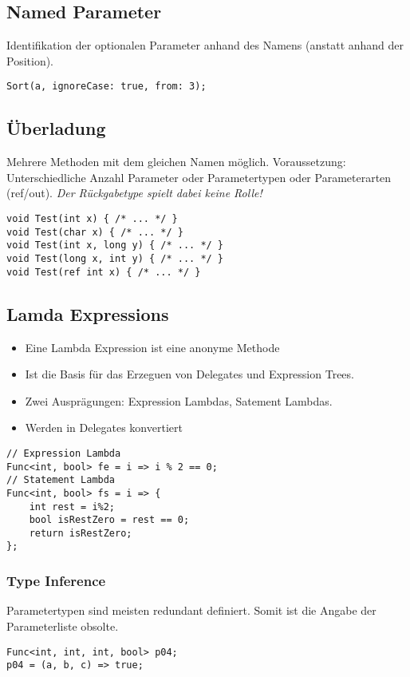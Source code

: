 \subsection{Named Parameter}
Identifikation der optionalen Parameter anhand des Namens (anstatt anhand der Position). 
\begin{lstlisting}
Sort(a, ignoreCase: true, from: 3);
\end{lstlisting}

\subsection{Überladung}
Mehrere Methoden mit dem gleichen Namen möglich. Voraussetzung: Unterschiedliche Anzahl Parameter oder Parametertypen oder Parameterarten (ref/out). \textit{Der Rückgabetype spielt dabei keine Rolle!}
\begin{lstlisting}
void Test(int x) { /* ... */ } 
void Test(char x) { /* ... */ } 
void Test(int x, long y) { /* ... */ } 
void Test(long x, int y) { /* ... */ } 
void Test(ref int x) { /* ... */ }
\end{lstlisting}



\subsection{Lamda Expressions}
\begin{itemize}
  \itemsep -0.5em 
  \item Eine Lambda Expression ist eine anonyme Methode
  \item Ist die Basis für das Erzeguen von Delegates und Expression Trees.
  \item Zwei Ausprägungen: Expression Lambdas, Satement Lambdas.	
  \item Werden in Delegates konvertiert
\end{itemize}

\begin{lstlisting}
// Expression Lambda 
Func<int, bool> fe = i => i % 2 == 0;
// Statement Lambda 
Func<int, bool> fs = i => {
	int rest = i%2; 
	bool isRestZero = rest == 0; 
	return isRestZero;
};
\end{lstlisting}

\subsubsection{Type Inference}
Parametertypen sind meisten redundant definiert. Somit ist die Angabe der Parameterliste obsolte.

\begin{lstlisting}
Func<int, int, int, bool> p04;
p04 = (a, b, c) => true;
\end{lstlisting}
\pagebreak
